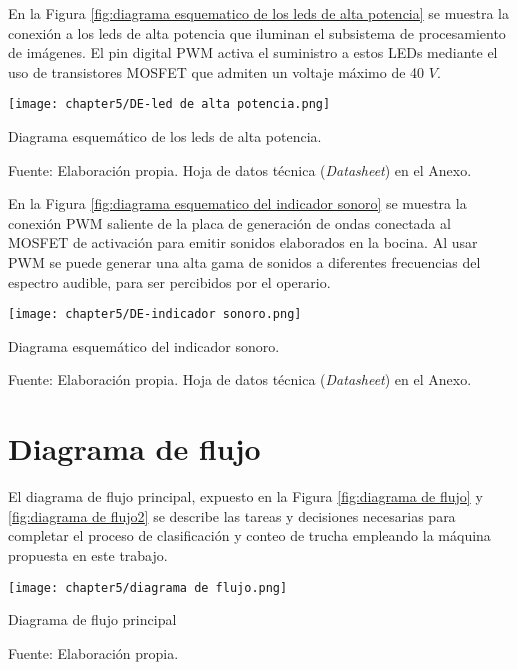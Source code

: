 En la Figura \ref{fig:diagrama esquematico de los leds de alta potencia} se muestra la conexión a los leds de alta potencia que iluminan el subsistema de procesamiento de imágenes. El pin digital PWM activa el suministro a estos LEDs mediante el uso de transistores MOSFET que admiten un voltaje máximo de 40 $V$.

\begin{myfigure}[H]
	\footnotesize\centering
	\texttt{[image: chapter5/DE-led de alta potencia.png]}
	\caption{Diagrama esquemático de los leds de alta potencia.}
	\begin{myflushcenter}
		Fuente: Elaboración propia. Hoja de datos técnica (\textit{Datasheet}) en el Anexo.
	\end{myflushcenter}
	\label{fig:diagrama esquematico de los leds de alta potencia}
\end{myfigure}

En la Figura \ref{fig:diagrama esquematico del indicador sonoro} se muestra la conexión PWM saliente de la placa de generación de ondas conectada al MOSFET de activación para emitir sonidos elaborados en la bocina. Al usar PWM se puede generar una alta gama de sonidos a diferentes frecuencias del espectro audible, para ser percibidos por el operario.

\begin{myfigure}[H]
	\footnotesize\centering
	\texttt{[image: chapter5/DE-indicador sonoro.png]}
	\caption{Diagrama esquemático del indicador sonoro.}
	\begin{myflushcenter}
		Fuente: Elaboración propia. Hoja de datos técnica (\textit{Datasheet}) en el Anexo.
	\end{myflushcenter}
	\label{fig:diagrama esquematico del indicador sonoro}
\end{myfigure}




\section{Diagrama de flujo}

El diagrama de flujo principal, expuesto en la Figura \ref{fig:diagrama de flujo} y \ref{fig:diagrama de flujo2} se describe las tareas y decisiones necesarias para completar el proceso de clasificación y conteo de trucha empleando la máquina propuesta en este trabajo.

\begin{myfigure}[H]
	\footnotesize\centering
	\texttt{[image: chapter5/diagrama de flujo.png]}
	\caption{Diagrama de flujo principal}
	\begin{myflushcenter}
		Fuente: Elaboración propia.
	\end{myflushcenter}
	\label{fig:diagrama de flujo}
\end{myfigure}


